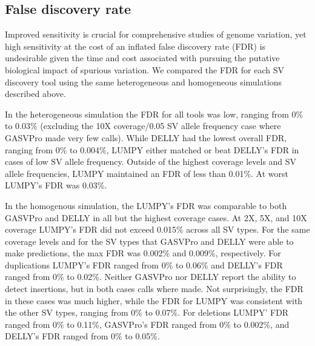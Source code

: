 \documentclass[10pt]{bmc_article}
\newenvironment{bmcformat}{\begin{raggedright}\baselineskip20pt\sloppy\setboolean{publ}{false}}{\end{raggedright}\baselineskip20pt\sloppy}
\begin{document}
\begin{bmcformat}
%
%

\subsection*{False discovery rate}
Improved sensitivity is crucial for comprehensive studies of genome variation,
yet high sensitivity at the cost of an inflated false discovery rate (FDR) is
undesirable given the time and cost associated with pursuing the putative
biological impact of spurious variation.  We compared the FDR for each SV
discovery tool using the same heterogeneous and homogeneous simulations
described above.

In the heterogeneous simulation the FDR for all tools was low, ranging from 0\%
to 0.03\% (excluding the 10X coverage/0.05 SV allele frequency case where
GASVPro made very few calls).  While DELLY had the lowest overall FDR, ranging
from 0\% to 0.004\%, LUMPY either matched or beat DELLY’s FDR in cases of low SV
allele frequency.  Outside of the highest coverage levels and SV allele
frequencies, LUMPY maintained an FDR of less than 0.01\%.  At worst LUMPY's FDR
was 0.03\%.

In the homogenous simulation, the LUMPY’s FDR was comparable to both GASVPro and
DELLY in all but the highest coverage cases.   At 2X, 5X, and 10X coverage
LUMPY’s FDR did not exceed 0.015\% across all SV types.  For the same coverage
levels and for the SV types that GASVPro and DELLY were able to make
predictions, the max FDR was 0.002\% and 0.009\%, respectively.  For
duplications LUMPY’s FDR ranged from 0\% to 0.06\% and DELLY’s FDR ranged from
0\% to 0.02\%.  Neither GASVPro nor DELLY report the ability to detect
insertions, but in both cases calls where made.  Not surprisingly, the FDR in
these cases was much higher, while the FDR for LUMPY was consistent with the
other SV types, ranging from 0\% to 0.07\%.  For deletions LUMPY’ FDR ranged
from 0\% to 0.11\%, GASVPro’s FDR ranged from 0\% to 0.002\%, and DELLY’s FDR
ranged from 0\% to 0.05\%.


\end{bmcformat}
\end{document}
